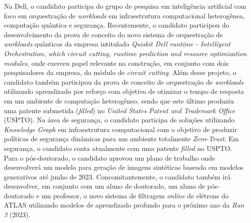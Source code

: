 Na Dell, o candidato participa do grupo de pesquisa em inteligência artificial com foco em orquestração 
de \emph{workloads} em infraestrutura computacional heterogênea, computação quântica e segurança. 
Recentemente, o candidato participou do desenvolvimento da prova de conceito do novo sistema de 
orquestração de \emph{workloads} quânticos da empresa intitulado \emph{Quiskit Dell runtime - Intelligent 
Orchestration, which circuit cutting, runtime prediction and resource optimization modules}, onde 
exerceu papel relevante na construção, em conjunto com dois pesquisadores da empresa, do módulo de 
\emph{circuit cutting}. Além desse projeto, o candidato também participou da prova de conceito de orquestração 
de \emph{workloads} utilizando aprendizado por reforço com objetivo de otimizar o tempo de resposta em um 
ambiente de computação heterogêneo, sendo que este último produziu uma patente submetida (\emph{filled}) no 
\emph{United States Patent and Trademark Office} (USPTO). Na área de segurança, o candidato participa de soluções 
utilizando \emph{Knowledge Graph} em infraestrutura computacional com o objetivo de produzir políticas de segurança 
dinâmicas para um ambiente totalmente \emph{Zero-Trust}. Em segurança, o candidato conta atualmente com uma patente 
\emph{filled} no USPTO. Para o pós-doutorado, o candidato aprovou um plano de trabalho onde desenvolverá um modelo 
para geração de imagens sintéticas baseado em modelos generativos até junho de 2023. Concomitantemente, o 
candidato também irá desenvolver, em conjunto com um aluno de doutorado, um aluno de pós-doutorado e um 
professor, o novo sistema de filtragem \emph{online} de elétrons do ATLAS utilizando modelos de aprendizado profundo 
para o próximo ano da \emph{Run 3} (2023). 




